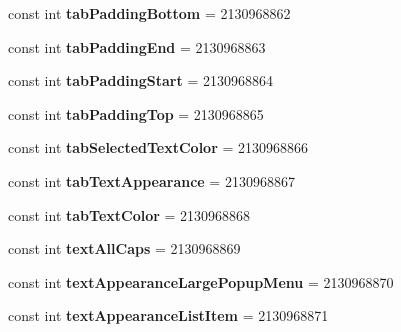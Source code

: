 \begin{DoxyCompactItemize}
const int {\bfseries tab\+Padding\+Bottom} = 2130968862
\item 
\mbox{\label{classst_delivery_1_1_resource_1_1_attribute_adae8d462ad2c9c4d1eef9520c1218dd8}} 
const int {\bfseries tab\+Padding\+End} = 2130968863
\item 
\mbox{\label{classst_delivery_1_1_resource_1_1_attribute_a25a030fd0728f6dc06b1287ee69c1d71}} 
const int {\bfseries tab\+Padding\+Start} = 2130968864
\item 
\mbox{\label{classst_delivery_1_1_resource_1_1_attribute_ac72ca3e99af0b0294d76b223068976c2}} 
const int {\bfseries tab\+Padding\+Top} = 2130968865
\item 
\mbox{\label{classst_delivery_1_1_resource_1_1_attribute_ae81029af259ff3ddb48080185927e0a5}} 
const int {\bfseries tab\+Selected\+Text\+Color} = 2130968866
\item 
\mbox{\label{classst_delivery_1_1_resource_1_1_attribute_a959c66a312093415cc954b8707971886}} 
const int {\bfseries tab\+Text\+Appearance} = 2130968867
\item 
\mbox{\label{classst_delivery_1_1_resource_1_1_attribute_a7e7f4aac2c2f7800398c4b3bf73e76c4}} 
const int {\bfseries tab\+Text\+Color} = 2130968868
\item 
\mbox{\label{classst_delivery_1_1_resource_1_1_attribute_a20f864ec6e2c09a3aa97711eb1ea4a7d}} 
const int {\bfseries text\+All\+Caps} = 2130968869
\item 
\mbox{\label{classst_delivery_1_1_resource_1_1_attribute_ac2742cd22896ac3b00e742f4c6983895}} 
const int {\bfseries text\+Appearance\+Large\+Popup\+Menu} = 2130968870
\item 
\mbox{\label{classst_delivery_1_1_resource_1_1_attribute_a7ec8e4fa601ea281dd72bd21f4676f0a}} 
const int {\bfseries text\+Appearance\+List\+Item} = 2130968871

\end{DoxyCompactItemize}
